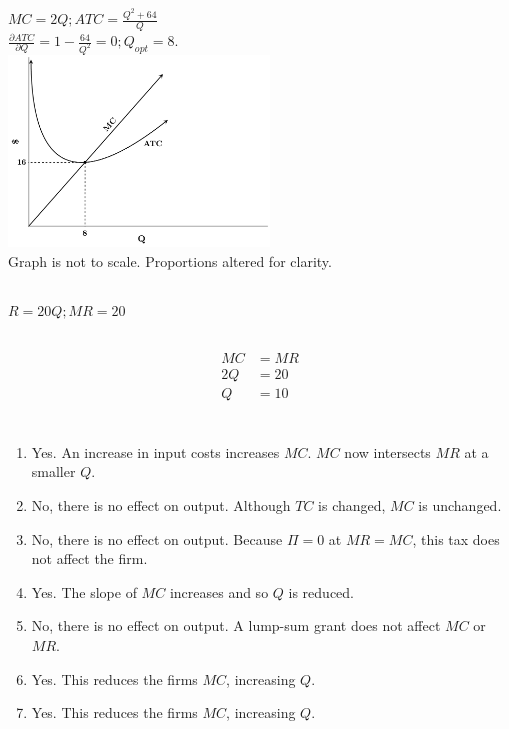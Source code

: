 \documentclass{article}
\begin{document}
	\subsection[b]{}
		$ MC = 2Q; ATC = \frac{Q^2+64}{Q} $ \\
		$ \frac{\partial ATC}{\partial Q} = 1- \frac{64}{Q^2} = 0; Q_{opt} = 8.$ \\
		\includegraphics[height=2in]{Charts/6b}
		 \\Graph is not to scale. Proportions altered for clarity. 
	\subsection[c]{}
		$ R = 20Q; MR = 20 $
	\subsection[d]{}
		\begin{align*}
			MC &= MR \\
			2Q &= 20 \\
			Q & = 10
		\end{align*}	
		
\section[7]{}
	\renewcommand{\theenumi}{\alph{enumi})}
	\renewcommand{\labelenumi}{\theenumi}
	
	\begin{enumerate}
		\item Yes. An increase in input costs increases $MC$. $MC$ now intersects $MR$ at a smaller $Q$.
		\item No, there is no effect on output. Although $TC$ is changed, $MC$ is unchanged. 
		\item No, there is no effect on output. Because $\Pi  = 0$ at $MR=MC$, this tax does not affect the firm. 
		\item Yes. The slope of $MC$ increases and so $Q$ is reduced. 
		\item No, there is no effect on output. A lump-sum grant does not affect $MC$ or $MR$. 
		\item Yes. This reduces the firms $MC$, increasing $Q$. 
		\item Yes. This reduces the firms $MC$, increasing $Q$. 
	\end{enumerate}			
													

\end{document}
